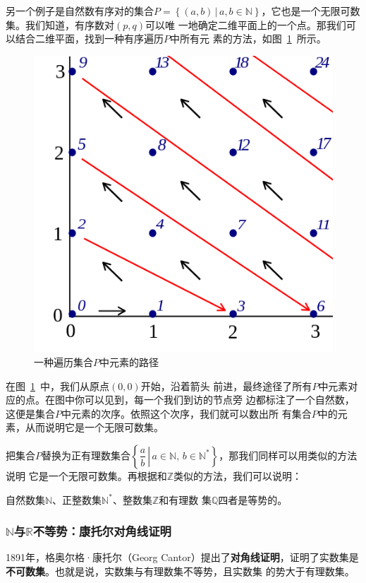 另一个例子是自然数有序对的集合$P=\left\{ \left( a,b \right) \,|\, a,b\in\mathbb{N} 
\right\} $，它也是一个无限可数集。我们知道，有序数对$\left( p,q \right) $可以唯
一地确定二维平面上的一个点。那我们可以结合二维平面，找到一种有序遍历$P$中所有元
素的方法，如图~\ref{fig:pairing_natural}~所示。

\begin{figure}[H]
    \centering
    \includegraphics[width=0.5\linewidth]{fig/pairing_natural.png}
    \caption{一种遍历集合$P$中元素的路径}\label{fig:pairing_natural}
\end{figure}

在图~\ref{fig:pairing_natural}~中，我们从原点$\left( 0,0 \right) $开始，沿着箭头
前进，最终途径了所有$P$中元素对应的点。在图中你可以见到，每一个我们到访的节点旁
边都标注了一个自然数，这便是集合$P$中元素的次序。依照这个次序，我们就可以数出所
有集合$P$中的元素，从而说明它是一个无限可数集。

把集合$P$替换为正有理数集合$\left\{\left. \dfrac{a}{b}\,\right|\, a\in 
\mathbb{N},\,b\in\mathbb{N}^\ast \right\} $，那我们同样可以用类似的方法说明
它是一个无限可数集。再根据和$\mathbb{Z}$类似的方法，我们可以说明：

\begin{rawthm}
    自然数集$\mathbb{N}$、正整数集$\mathbb{N}^\ast$、整数集$\mathbb{Z}$和有理数
    集$\mathbb{Q}$四者是等势的。
\end{rawthm}

\subsubsection{$\mathbb{N}$与$\mathbb{R}$不等势：康托尔对角线证明}

1891年，格奥尔格·康托尔（Georg Cantor）提出了\textbf{对角线证明}，证明了实数集是\textbf{不可数集}。也就是说，实数集与有理数集不等势，且实数集
的势大于有理数集。

